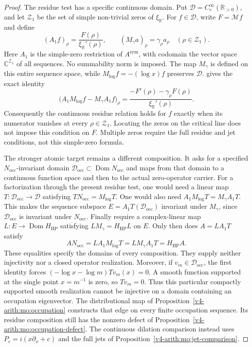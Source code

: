 \begin{proof}

The residue test has a specific continuous domain. Put
$\mathscr D=C_c^\infty(\mathbb R_{>0})$, and let $\mathcal Z_1$
be the set of simple non-trivial zeros of $\xi_{\mathbb R}$.
For $f\in\mathscr D$, write $F=\mathcal Mf$ and define
\[
 (A_1f)_\rho=\frac{F(\rho)}{\xi_{\mathbb R}'(\rho)},\qquad
 (M_\gamma a)_\rho=\gamma_\rho a_\rho
 \quad(\rho\in\mathcal Z_1).
\]
Here $A_1$ is the simple-zero restriction of $A^{\mathrm{sym}}$,
with codomain the vector space $\mathbb C^{\mathcal Z_1}$ of all
sequences. No summability norm is imposed. The map $M_\gamma$ is
defined on this entire sequence space, while
$M_{\log}f=-(\log x)f$ preserves $\mathscr D$.
 gives the exact identity
\[
 \bigl(A_1M_{\log}f-M_\gamma A_1f\bigr)_\rho
 =\frac{-F'(\rho)-\gamma_\rho F(\rho)}
        {\xi_{\mathbb R}'(\rho)}.
\]
Consequently the continuous residue relation holds for $f$ exactly
when its numerator vanishes at every $\rho\in\mathcal Z_1$.
Locating the zeros on the critical line does not impose this
condition on $F$. Multiple zeros require the full residue and
jet conditions, not this simple-zero formula.

The stronger atomic target remains a different composition. It asks
for a specified $N_{\mathrm{occ}}$-invariant domain
$\mathscr D_{\mathrm{occ}}\subset\operatorname{Dom}N_{\mathrm{occ}}$
and maps from that domain to a continuous function space and then
to the actual zero-operator carrier. For a factorization through the
present residue test, one would need a linear map
$T:\mathscr D_{\mathrm{occ}}\to\mathscr D$ satisfying
$TN_{\mathrm{occ}}=M_{\log}T$. One would also need
$A_1M_{\log}T=M_\gamma A_1T$. This makes the sequence subspace
$E=A_1T(\mathscr D_{\mathrm{occ}})$ invariant under $M_\gamma$,
since $\mathscr D_{\mathrm{occ}}$ is invariant under $N_{\mathrm{occ}}$.
Finally require a complex-linear map
$L:E\to\operatorname{Dom}H_{\mathrm{HP}}$ satisfying
$LM_\gamma=H_{\mathrm{HP}}L$ on $E$. Only then does
$A=LA_1T$ satisfy
\[
 AN_{\mathrm{occ}}
 =LA_1M_{\log}T=LM_\gamma A_1T=H_{\mathrm{HP}}A.
\]
These equalities specify the domains of every composition. They
supply neither injectivity nor a closed operator realization.
Moreover, if $v_m\in\mathscr D_{\mathrm{occ}}$, the first identity
forces $(-\log x-\log m)Tv_m(x)=0$. A smooth function supported
at the single point $x=m^{-1}$ is zero, so $Tv_m=0$.
Thus this particular compactly supported smooth realization cannot
be injective on a domain containing an occupation eigenvector.
The distributional map of Proposition~\ref{v4-arith:mo:occupation} constructs
that edge on every finite occupation sequence. Its residue composition
still has the nonzero defect of Proposition~\ref{v4-arith:mo:occupation-defect}.
The continuous dilation comparison instead uses $P_c=i(x\partial_x+c)$
and the full jets of Proposition~\ref{v4-arith:mo:jet-comparison}.
\end{proof}

